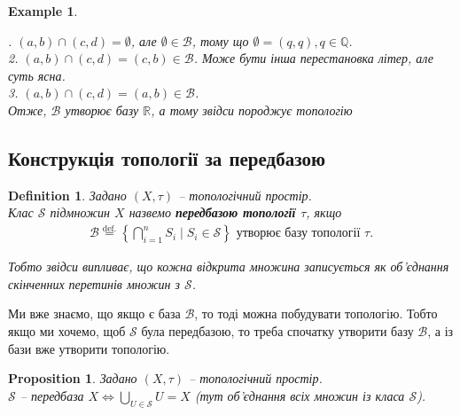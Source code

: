 \documentclass[a4paper, 10pt]{article}
\theoremstyle{theoremdd}
\newtheorem{definition}[theorem]{Definition}
\newtheorem{example}[theorem]{Example}
\newtheorem{proposition}[theorem]{Proposition}
\begin{document}
\begin{example}
\begin{figure}[H]
\end{figure}
. $(a,b) \cap (c,d) = \emptyset$, але $\emptyset \in \mathcal{B}$, тому що $\emptyset = (q,q), q \in \mathbb{Q}$.\\
2. $(a,b) \cap (c,d) = (c,b) \in \mathcal{B}$. Може бути інша перестановка літер, але суть ясна.\\
3. $(a,b) \cap (c,d) = (a,b) \in \mathcal{B}$.\\
Отже, $\mathcal{B}$ утворює базу $\mathbb{R}$, а тому звідси породжує топологію
\fi
\end{example}

\subsection{Конструкція топології за передбазою}
\begin{definition}
Задано $(X,\tau)$ -- топологічний простір.\\
Клас $\mathcal{S}$ підмножин $X$ назвемо \textbf{передбазою топології $\tau$}, якщо
\begin{align*}
\mathcal{B} \overset{\text{def.}}{=} \left\{ \bigcap_{i=1}^n S_i \mid S_i \in \mathcal{S} \right\} \text{ утворює базу топології } \tau.
\end{align*}
\iffalse
Тобто з цього випливає, що
\begin{align*}
\forall U \in \tau: U = \displaystyle\bigcup_{\bigcap_{i=1}^n S_i \in \mathcal{\tilde{B}}} \bigcap_{i=1}^n S_i, \text{ де } \mathcal{\tilde{B}} \subset \mathcal{B}
\end{align*}
\fi
Тобто звідси випливає, що кожна відкрита множина записується як об'єднання скінченних перетинів множин з $\mathcal{S}$.
\end{definition}

\noindent Ми вже знаємо, що якщо є база $\mathcal{B}$, то тоді можна побудувати топологію. Тобто якщо ми хочемо, щоб $\mathcal{S}$ була передбазою, то треба спочатку утворити базу $\mathcal{B}$, а із бази вже утворити топологію.

\begin{proposition}
Задано $(X,\tau)$ -- топологічний простір.\\
$\mathcal{S}$ -- передбаза $X \iff \displaystyle\bigcup_{U \in \mathcal{S}} U = X$ (тут об'єднання всіх множин із класа $\mathcal{S}$).
\end{proposition}
\end{document}
